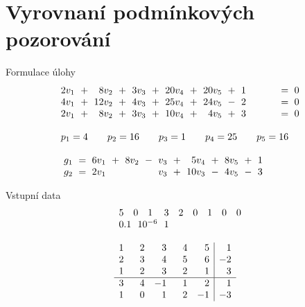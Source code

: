 %
% 
% 
% 
% 
%

\section*{Vyrovnaní podmínkových pozorování}

\begin{Example}{Formulace úlohy}
\begin{align*}
\arraycolsep=3pt
\begin{array}{rrrrrrrrrrrrr}
   2v_1 &+&  8v_2 &+& 3v_3 &+& 20v_4 &+& 20v_5 &+& 1 &=& 0 \\
   4v_1 &+& 12v_2 &+& 4v_3 &+& 25v_4 &+& 24v_5 &-& 2 &=& 0 \\
   2v_1 &+&  8v_2 &+& 3v_3 &+& 10v_4 &+&  4v_5 &+& 3 &=& 0 \\
   \\
   \multicolumn{12}{l}
     {p_1=4\qquad p_2=16\qquad p_3=1\qquad p_4=25\qquad p_5=16} \\
   \\
   \multicolumn{13}{l}{
   \begin{array}{rrrrrrrrrrrrr}
     g_1  &=& 6v_1 &+& 8v_2 &-& v_3 &+&  5v_4 &+& 8v_5 &+& 1\\
     g_2  &=& 2v_1 & &      & & v_3 &+& 10v_3 &-& 4v_5 &-& 3\\
   \end{array}}
\end{array}
\end{align*}
\end{Example}
%
\begin{Example}{Vstupní data}
\bgroup\setlength{\abovedisplayskip}{0pt}
\begin{align*}
\begin{array}{ll}
\begin{array}{rrrrrrrrr}
  5 &  0 & 1 & 3 & 2 & 0 & 1 & 0 & 0 \\
  \multicolumn{4}{l}{0.1 ~~ 10^{-6} ~~ 1}\\
\end{array}\\
\\
\begin{array}{rrrrr|r}
1 & ~~2 & ~~3 &  ~~4 & ~~5 & 1 \\
2 & 3 & 4 &  5 & 6 &-2 \\
1 & 2 & 3 &  2 & 1 & 3 \\
\hline
3 & 4 &-1 &  1 & 2 & 1 \\
1 & 0 & 1 &  2 &-1 &-3 \\
\end{array}
\end{array}%
\end{align*}
\egroup
\end{Example}

